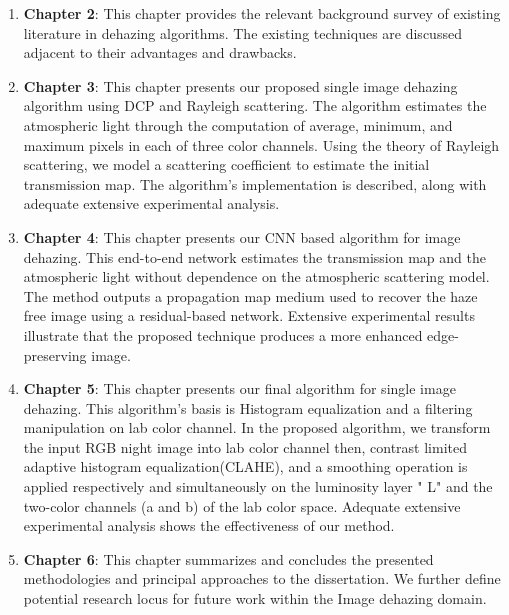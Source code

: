 \documentclass[doctor,english,listoffigures,listoftables]{thesis-uestc}
\begin{document}
\begin{enumerate}
	\item \textbf{Chapter 2}: This chapter provides the relevant background survey of existing literature in dehazing algorithms. The existing techniques are discussed adjacent to their advantages and drawbacks.
	\item  \textbf{Chapter 3}: This chapter presents our proposed single image dehazing algorithm using DCP and Rayleigh scattering. The algorithm estimates the atmospheric light through the computation of average, minimum, and maximum pixels in each of three color channels. Using the theory of Rayleigh scattering, we model a scattering coefficient to estimate the initial transmission map. The algorithm's implementation is described, along with adequate extensive experimental analysis.
	
	\item  \textbf{Chapter 4}: This chapter presents our CNN based algorithm for image dehazing. This end-to-end network estimates the transmission map and the atmospheric light without dependence on the atmospheric scattering model. The method outputs a propagation map medium used to recover the haze free image using a residual-based network. Extensive experimental results illustrate that the proposed technique produces a more enhanced edge-preserving image.
	
	\item  \textbf{Chapter 5}: This chapter presents our final algorithm for single image dehazing. This algorithm's basis is Histogram equalization and a filtering manipulation on lab color channel. In the proposed algorithm, we transform the input RGB night image into lab color channel then, contrast limited adaptive histogram equalization(CLAHE), and a smoothing operation is applied respectively and simultaneously on the luminosity layer " L" and the two-color channels (a and b) of the lab color space. Adequate extensive experimental analysis shows the effectiveness of our method.
	\item  \textbf{Chapter 6}: This chapter summarizes and concludes the presented methodologies and principal approaches to the dissertation. We further define potential research locus for future work within the Image dehazing domain. 
\end{enumerate}
\end{document}
